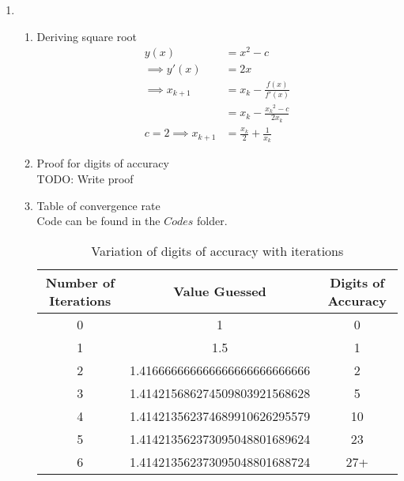 \documentclass[11pt]{article}
\begin{document}
\begin{enumerate}
\begin{enumerate}
\begin{enumerate}
						\end{enumerate}
				\item %
						\begin{enumerate}
								\item Deriving square root \\
										\begin{align*}
											 y(x) &= x^2-c \\
												\implies y'(x) &= 2x\\
												\implies  x_{k+1} &= x_{k} - \frac{f(x)}{f'(x)} \\
												&= x_{k} - \frac{{x_k}^2 - c}{2x_k} \\
												 c=2 \implies x_{k+1} &= \frac{x_k}{2} + \frac{1}{x_k} 
										\end{align*}
								\item Proof for digits of accuracy \\
										TODO: Write proof
								\item Table of convergence rate \\
										Code can be found in the $Codes$ folder. \\
												\begin{table}[!htb]
												\centering
												\caption{Variation of digits of accuracy with iterations}
												\label{my-label}
												\begin{tabular}{|c|c|c|}
												\hline
												\textbf{Number of Iterations} & \textbf{Value Guessed}        & \textbf{Digits of Accuracy} \\ \hline
												0                             & 1                             & 0                           \\ \hline
												1                             & 1.5                           & 1                           \\ \hline
												2                             & 1.416666666666666666666666666 & 2                           \\ \hline
												3                             & 1.414215686274509803921568628 & 5                           \\ \hline
												4                             & 1.414213562374689910626295579 & 10                          \\ \hline
												5                             & 1.414213562373095048801689624 & 23                          \\ \hline
												6                             & 1.414213562373095048801688724 & 27+                         \\ \hline

\end{tabular}
\end{table}
\end{enumerate}
\end{enumerate}
\end{enumerate}
\end{document}

